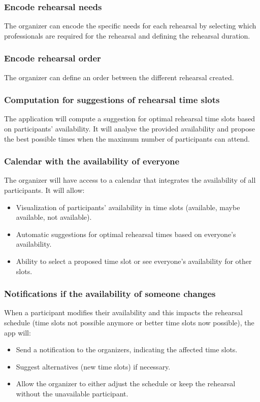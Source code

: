 \documentclass[11pt]{article}
\begin{document}
\subsubsection{Encode rehearsal needs}
The organizer can encode the specific needs for each rehearsal by selecting which professionals are required for the rehearsal and defining the rehearsal duration. 

\subsubsection{Encode rehearsal order}
The organizer can define an order between the different rehearsal created.

\subsubsection{Computation for suggestions of rehearsal time slots} 
The application will compute a suggestion for optimal rehearsal time slots based on participants' availability. It will analyse the provided availability and propose the best possible times when the maximum number of participants can attend.

\subsubsection{Calendar with the availability of everyone}
The organizer will have access to a calendar that integrates the availability of all participants. It will allow:
\begin{itemize}
    \item Visualization of participants' availability in time slots (available, maybe available, not available).
    \item Automatic suggestions for optimal rehearsal times based on everyone's availability.
    \item Ability to select a proposed time slot or see everyone's availability for other slots.
\end{itemize}

\subsubsection{Notifications if the availability of someone changes}
When a participant modifies their availability and this impacts the rehearsal schedule (time slots not possible anymore or better time slots now possible), the app will:
\begin{itemize}
    \item Send a notification to the organizers, indicating the affected time slots.
    \item Suggest alternatives (new time slots) if necessary.
    \item Allow the organizer to either adjust the schedule or keep the rehearsal without the unavailable participant.
\end{itemize}
\end{document}
